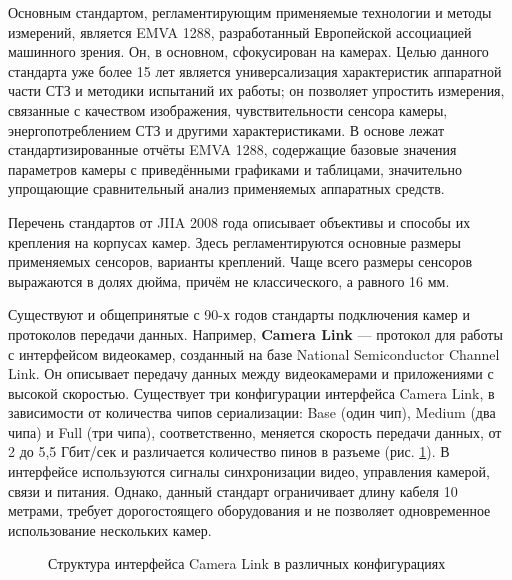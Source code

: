 Основным стандартом, регламентирующим применяемые технологии и методы измерений, является EMVA 1288, разработанный Европейской ассоциацией машинного зрения. Он, в основном, сфокусирован на камерах. Целью данного стандарта уже более 15 лет является универсализация характеристик аппаратной части СТЗ и методики испытаний их работы; он позволяет упростить измерения, связанные с качеством изображения, чувствительности сенсора камеры, энергопотреблением СТЗ и другими характеристиками. В основе лежат стандартизированные отчёты EMVA 1288, содержащие базовые значения параметров камеры с приведёнными графиками и таблицами, значительно упрощающие сравнительный анализ применяемых аппаратных средств.

Перечень стандартов от JIIA 2008 года описывает объективы и способы их крепления на корпусах камер. Здесь регламентируются основные размеры применяемых сенсоров, варианты креплений. Чаще всего размеры сенсоров выражаются в долях дюйма, причём не классического, а равного 16 мм. 

Существуют и общепринятые с 90-х годов стандарты подключения камер и протоколов передачи данных. Например, \textbf{Camera Link} --- протокол для работы с интерфейсом видеокамер, созданный на базе National Semiconductor Channel Link. Он описывает передачу данных между видеокамерами и приложениями с высокой скоростью. Существует три конфигурации интерфейса Camera Link, в зависимости от количества чипов сериализации: Base (один чип), Medium (два чипа) и Full (три чипа), соответственно, меняется скорость передачи данных, от 2 до 5,5 Гбит/сек и различается количество пинов в разъеме (рис. \cref{fig:full-cameralink}). В интерфейсе используются сигналы синхронизации видео, управления камерой, связи и питания. Однако, данный стандарт ограничивает длину кабеля 10 метрами, требует дорогостоящего оборудования и не позволяет одновременное использование нескольких камер.

\begin{figure}[ht]
	\caption{Структура интерфейса Camera Link в различных конфигурациях}\label{fig:full-cameralink}
\end{figure}

